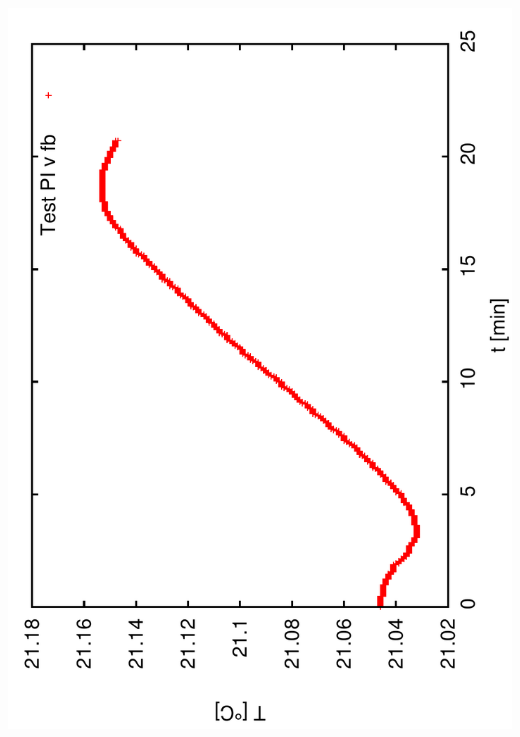 \documentclass[a4paper,11pt]{book}
\begin{document}
\includegraphics[angle=-90,scale=0.15]{image01a.pdf}\\
\end{document}
